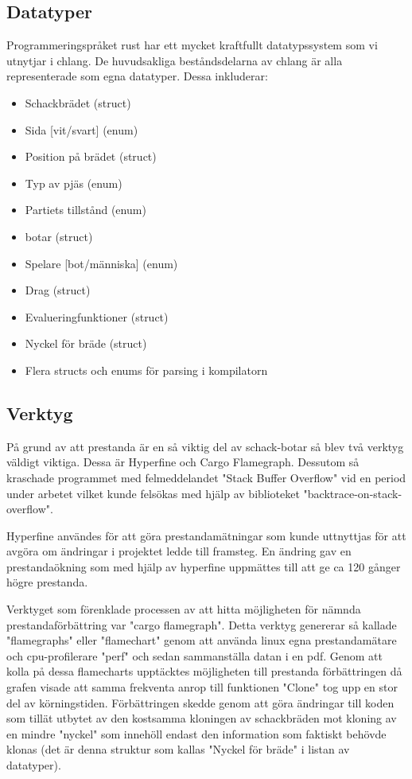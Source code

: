 \documentclass{article}
\begin{document}
	\subsection{Datatyper}
	Programmeringspråket rust har ett mycket kraftfullt datatypssystem som vi utnytjar i chlang. De huvudsakliga beståndsdelarna av chlang är alla representerade som egna datatyper. Dessa inkluderar: 
	\begin{itemize}
	\item Schackbrädet (struct)
	\item Sida [vit/svart] (enum)
	\item Position på brädet (struct)
	\item Typ av pjäs (enum)
	\item Partiets tillstånd (enum)
	\item botar (struct)
	\item Spelare [bot/människa] (enum)
	\item Drag (struct)
	\item Evalueringfunktioner (struct)
	\item Nyckel för bräde (struct)
	\item Flera structs och enums för parsing i kompilatorn
	\end{itemize}	

	\subsection{Verktyg}
	På grund av att prestanda är en så viktig del av schack-botar så blev två verktyg väldigt viktiga. Dessa är Hyperfine och Cargo Flamegraph. Dessutom så kraschade programmet med felmeddelandet "Stack Buffer Overflow" vid en period under arbetet vilket kunde felsökas med hjälp av biblioteket "backtrace-on-stack-overflow".

	Hyperfine användes för att göra prestandamätningar som kunde uttnyttjas för att avgöra om ändringar i projektet ledde till framsteg. En ändring gav en prestandaökning som med hjälp av hyperfine uppmättes till att ge ca 120 gånger högre prestanda.

	Verktyget som förenklade processen av att hitta möjligheten för nämnda prestandaförbättring var "cargo flamegraph". Detta verktyg genererar så kallade "flamegraphs" eller "flamechart" genom att använda linux egna prestandamätare och cpu-profilerare "perf" och sedan sammanställa datan i  en pdf. Genom att kolla på dessa flamecharts upptäcktes möjligheten till prestanda förbättringen då grafen visade att samma frekventa anrop till funktionen "Clone" tog upp en stor del av körningstiden. Förbättringen skedde genom att göra ändringar till koden som tillät utbytet av den kostsamma kloningen av schackbräden mot kloning av en mindre "nyckel" som innehöll endast den information som faktiskt behövde klonas (det är denna struktur som kallas "Nyckel för bräde" i listan av datatyper).
\end{document}
